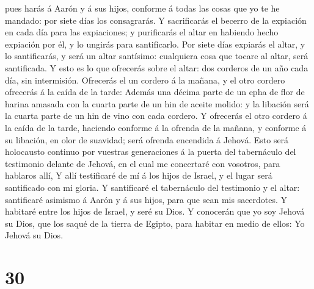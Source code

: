 pues harás á Aarón y á sus hijos, conforme á todas las cosas que yo te
he mandado: por siete días los consagrarás.  Y
sacrificarás el becerro de la expiación en cada día para las
expiaciones; y purificarás el altar en habiendo hecho expiación por él,
y lo ungirás para santificarlo.  Por siete días expiarás
el altar, y lo santificarás, y será un altar santísimo: cualquiera cosa
que tocare al altar, será santificada.  Y esto es lo que
ofrecerás sobre el altar: dos corderos de un año cada día, sin
intermisión.  Ofrecerás el un cordero á la mañana, y el
otro cordero ofrecerás á la caída de la tarde:  Además
una décima parte de un epha de flor de harina amasada con la cuarta
parte de un hin de aceite molido: y la libación será la cuarta parte de
un hin de vino con cada cordero.  Y ofrecerás el otro
cordero á la caída de la tarde, haciendo conforme á la ofrenda de la
mañana, y conforme á su libación, en olor de suavidad; será ofrenda
encendida á Jehová.  Esto será holocausto continuo por
vuestras generaciones á la puerta del tabernáculo del testimonio delante
de Jehová, en el cual me concertaré con vosotros, para hablaros allí,
 Y allí testificaré de mí á los hijos de Israel, y el
lugar será santificado con mi gloria.  Y santificaré el
tabernáculo del testimonio y el altar: santificaré asimismo á Aarón y á
sus hijos, para que sean mis sacerdotes.  Y habitaré
entre los hijos de Israel, y seré su Dios.  Y conocerán
que yo soy Jehová su Dios, que los saqué de la tierra de Egipto, para
habitar en medio de ellos: Yo Jehová su Dios.

\hypertarget{section-29}{%
\section{30}\label{section-29}}

